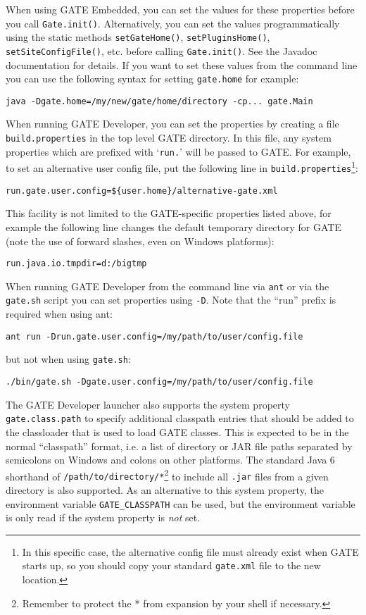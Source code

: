 When using GATE Embedded, you can set the values for these properties before
you call {\tt Gate.init()}.  Alternatively, you can set the values
programmatically using the static methods {\tt setGateHome()},
{\tt setPluginsHome()}, {\tt setSiteConfigFile()}, etc.  before calling
{\tt Gate.init()}.  See the Javadoc documentation for details.
If you want to set these values from the command line you can use the following
syntax for setting {\tt gate.home} for example:

{\tt java -Dgate.home=/my/new/gate/home/directory -cp... gate.Main}

When running GATE Developer, you can set the properties by creating a file
{\tt build.properties} in the top level GATE directory.  In this file, any
system properties which are prefixed with `{\tt run.}' will be passed to
GATE.  For example, to set an alternative user config file, put the following
line in {\tt build.properties}\footnote{In this specific case, the alternative
config file must already exist when GATE starts up, so you should copy your
standard {\tt gate.xml} file to the new location.}:

{\tt run.gate.user.config=\$\{user.home\}/alternative-gate.xml}

This facility is not limited to the GATE-specific properties listed above, for
example the following line changes the default temporary directory for GATE
(note the use of forward slashes, even on Windows platforms):

{\tt run.java.io.tmpdir=d:/bigtmp}

When running GATE Developer from the command line via \verb|ant| or via the
{\tt gate.sh} script you can set properties using \verb!-D!.  Note that the
``run'' prefix is required when using ant:

\texttt{ant run -Drun.gate.user.config=/my/path/to/user/config.file}

but not when using {\tt gate.sh}:

\texttt{./bin/gate.sh -Dgate.user.config=/my/path/to/user/config.file} 

The GATE Developer launcher also supports the system property
{\tt gate.class.path} to specify additional classpath entries that should be
added to the classloader that is used to load GATE classes.  This is expected
to be in the normal ``classpath'' format, i.e. a list of directory or JAR file
paths separated by semicolons on Windows and colons on other platforms.  The
standard Java 6 shorthand of {\tt /path/to/directory/*}\footnote{Remember to
protect the * from expansion by your shell if necessary.} to include all
{\tt .jar} files from a given directory is also supported.  As an alternative
to this system property, the environment variable \verb!GATE_CLASSPATH! can be
used, but the environment variable is only read if the system property is
{\em not} set.

